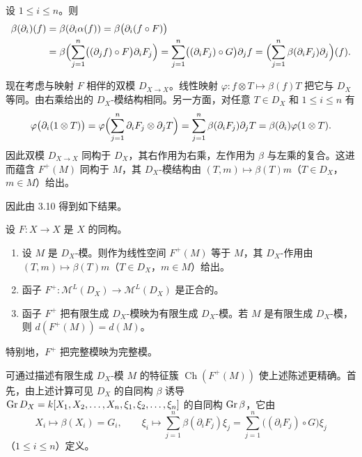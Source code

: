 设 $1\le i\le n$。则
\begin{align*}
\beta(\partial_i)(f)&=\beta(\partial_i\alpha(f))=\beta\bigl(\partial_i(f\circ F)\bigr)\\
&=\beta\Bigl(\sum_{j=1}^n\bigl((\partial_jf)\circ F\bigr)\partial_iF_j\Bigr)=\sum_{j=1}^n\bigl((\partial_iF_j)\circ G\bigr)\partial_jf=\Bigl(\sum_{j=1}^n\beta(\partial_iF_j)\partial_j\Bigr)(f).
\end{align*}

现在考虑与映射 $F$ 相伴的双模 $D_{X\to X}$。线性映射 $\varphi:f\otimes T\longmapsto\beta(f)T$ 把它与 $D_X$ 等同。由右乘给出的 $D_X$-模结构相同。另一方面，对任意 $T\in D_X$ 和 $1\le i\le n$ 有
$$\varphi\bigl(\partial_i(1\otimes T)\bigr)=\varphi\Bigl(\sum_{j=1}^n\partial_iF_j\otimes\partial_jT\Bigr)=\sum_{j=1}^n\beta(\partial_iF_j)\partial_jT=\beta(\partial_i)\varphi(1\otimes T).$$
因此双模 $D_{X\to X}$ 同构于 $D_X$，其右作用为右乘，左作用为 $\beta$ 与左乘的复合。这进而蕴含 $F^+(M)$ 同构于 $M$，其 $D_X$-模结构由 $(T,m)\longmapsto\beta(T)m$（$T\in D_X$，$m\in M$）给出。

因此由 3.10 得到如下结果。

\begin{lemma}
设 $F:X\longrightarrow X$ 是 $X$ 的同构。
\begin{enumerate}[label=(\roman*)]
  \item 设 $M$ 是 $D_X$-模。则作为线性空间 $F^+(M)$ 等于 $M$，其 $D_X$-作用由 $(T,m)\longmapsto\beta(T)m$（$T\in D_X$，$m\in M$）给出。
  \item 函子 $F^+:\mathcal{M}^L(D_X)\to\mathcal{M}^L(D_X)$ 是正合的。
  \item 函子 $F^+$ 把有限生成 $D_X$-模映为有限生成 $D_X$-模。若 $M$ 是有限生成 $D_X$-模，则 $d(F^+(M))=d(M)$。
\end{enumerate}
特别地，$F^+$ 把完整模映为完整模。
\end{lemma}

可通过描述有限生成 $D_X$-模 $M$ 的特征簇 $\operatorname{Ch}(F^+(M))$ 使上述陈述更精确。首先，由上述计算可见 $D_X$ 的自同构 $\beta$ 诱导 $\operatorname{Gr} D_X=k[X_1,X_2,\dots,X_n,\xi_1,\xi_2,\dots,\xi_n]$ 的自同构 $\operatorname{Gr}\beta$，它由
$$X_i\longmapsto\beta(X_i)=G_i,\qquad \xi_i\longmapsto\sum_{j=1}^n\beta(\partial_iF_j)\xi_j=\sum_{j=1}^n\bigl((\partial_iF_j)\circ G\bigr)\xi_j$$
（$1\le i\le n$）定义。

